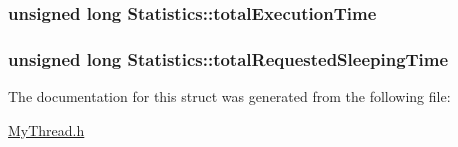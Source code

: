\hypertarget{structStatistics_aad62afe8a70e7a16f7e27dcd336b4a6a}{
\subsubsection[{total\-Execution\-Time}]{\setlength{\rightskip}{0pt plus 5cm}unsigned long Statistics\-::total\-Execution\-Time}}\label{structStatistics_aad62afe8a70e7a16f7e27dcd336b4a6a}
\hypertarget{structStatistics_a38503577532e0d274f2bbaac05b19c88}{
\subsubsection[{total\-Requested\-Sleeping\-Time}]{\setlength{\rightskip}{0pt plus 5cm}unsigned long Statistics\-::total\-Requested\-Sleeping\-Time}}\label{structStatistics_a38503577532e0d274f2bbaac05b19c88}


The documentation for this struct was generated from the following file\-:\begin{DoxyCompactItemize}
\item 
\hyperlink{MyThread_8h}{My\-Thread.\-h}\end{DoxyCompactItemize}
